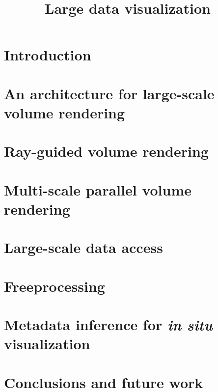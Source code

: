 \documentclass[12pt,twoside,headsepline,titlepage]{thesis}
\title{Large data visualization}
\begin{document}

\newpage

\tableofcontents

\chapter{Introduction}


\chapter[An architecture for volume rendering]{An architecture for large-scale volume rendering}
\label{chp:tuvok}


\chapter{Ray-guided volume rendering}
\label{chp:rayguided}


\chapter{Multi-scale parallel volume rendering}
\label{chp:multiscale}


\chapter{Large-scale data access}
\label{chp:io}


\chapter{Freeprocessing}
\label{chp:freeprocessing}


\chapter{Metadata inference for \textit{in situ} visualization}
\label{chp:inference}


\chapter{Conclusions and future work}
\label{chp:conclusions}




\end{document}
